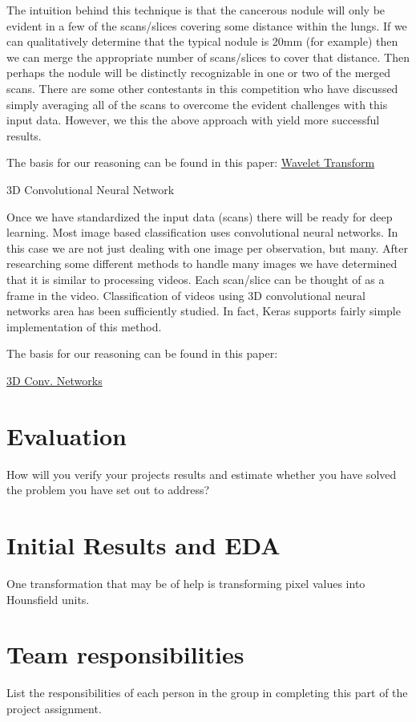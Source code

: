 \documentclass[11pt]{article}
\begin{document}
The intuition behind this technique is that the cancerous nodule will only be evident in a few of the scans/slices covering some distance within the lungs. If we can qualitatively determine that the typical nodule is 20mm (for example) then we can merge the appropriate number of scans/slices to cover that distance. Then perhaps the nodule will be distinctly recognizable in one or two of the merged scans.
	There are some other contestants in this competition who have discussed simply averaging all of the scans to overcome the evident challenges with this input data. However, we this the above approach with yield more successful results.


The basis for our reasoning can be found in this paper: 
\href{http://old.vision.ece.ucsb.edu/publications/94ICIPWav.pdf}{Wavelet Transform}




3D Convolutional Neural Network

Once we have standardized the input data (scans) there will be ready for deep learning. Most image based classification uses convolutional neural networks. In this case we are not just dealing with one image per observation, but many. After researching some different methods to handle many images we have determined that it is similar to processing videos. Each scan/slice can be thought of as a frame in the video. Classification of videos using 3D convolutional neural networks area has been sufficiently studied. In fact, Keras supports fairly simple implementation of this method.


The basis for our reasoning can be found in this paper:

\href{http://www.cv-foundation.org/openaccess/content_iccv_2015/papers/Tran_Learning_Spatiotemporal_Features_ICCV_2015_paper.pdf}{3D Conv. Networks}




\section{Evaluation}
How will you verify your projects results and estimate whether you have solved the problem you have set out to address?

\section{Initial Results and EDA}


One transformation that may be of help is transforming pixel values into Hounsfield units. 


\section{Team responsibilities}
 
List the responsibilities of each person in the group in completing this part of the project assignment.
\end{document}
